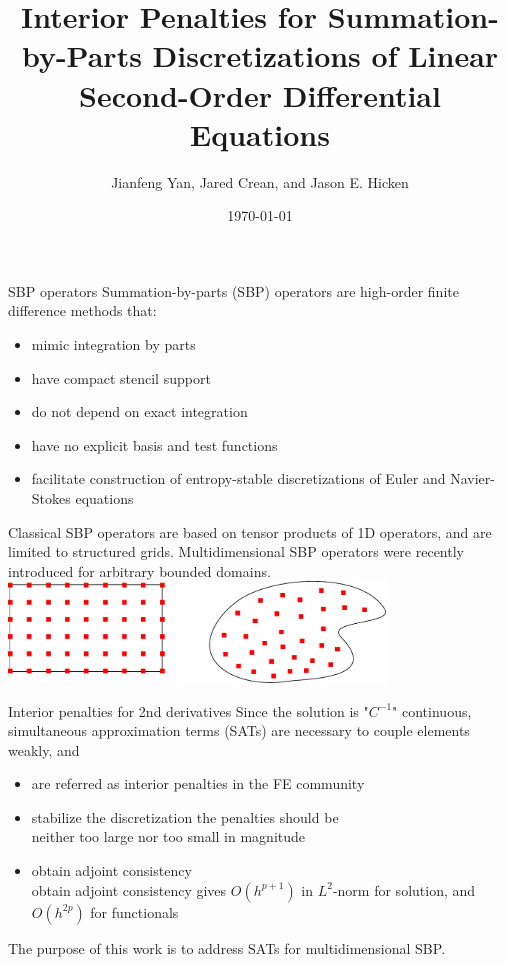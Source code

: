 \documentclass{beamer}
\title[Interior Penalties for SBP Discretizations of 2nd PDEs]{Interior Penalties for Summation-by-Parts Discretizations of Linear Second-Order Differential Equations}
\author[Yan \textit{et al}]{Jianfeng Yan, Jared Crean, and Jason E. Hicken}
\institute[]{\normalsize Dept. of MANE, RPI}
\date[]
{\today}
\begin{document}
\begin{frame}
    \titlepage
\end{frame}

\begin{frame}{SBP operators}
    Summation-by-parts (SBP) operators are high-order finite difference methods that:
    \begin{itemize}
        \item mimic integration by parts
        \item have compact stencil support
        \item do not depend on exact integration
        \item have no explicit basis and test functions
        \item facilitate construction of entropy-stable discretizations of Euler and Navier-Stokes equations
    \end{itemize}
\end{frame}

\begin{frame}
    Classical SBP operators are based on tensor products of 1D operators, and are limited to structured grids. Multidimensional SBP operators were recently introduced for arbitrary bounded domains\cite{Hicken2016SIAM}.
    \vskip 10mm
    \centering
    \includegraphics[width=0.75\textwidth]{./figures/generalize_tensor.pdf}
\end{frame}

\begin{frame}{Interior penalties for 2nd derivatives}
    Since the solution is "$C^{-1}$" continuous, simultaneous 
    approximation terms (SATs) are necessary to couple elements weakly, and 
    \begin{itemize}
        \item are referred as interior penalties in the FE community
        \item stabilize the discretization the penalties should be \\ neither too large nor too small in magnitude\cite{Arnold2002}
        \item obtain adjoint consistency \\
        obtain adjoint consistency gives $O(h^{p+1})$ in $L^2$-norm for solution, and $O(h^{2p})$ for functionals\cite{hartmann:2007b}
        
    \end{itemize}
    \vskip 5mm
    The purpose of this work is to address SATs for multidimensional SBP.
\end{frame}
\end{document}

